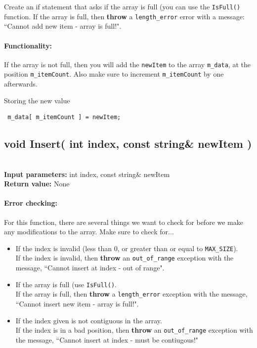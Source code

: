 \documentclass[a4paper,12pt]{book}
\begin{document}
    Create an if statement that asks if the array is full (you can use the
    \texttt{IsFull()} function. If the array is full, then
    \textbf{throw} a \texttt{length\_error}
    error with a message: ``Cannot add new item - array is full!".

    \paragraph{Functionality:} If the array is not full, then you will
    add the \texttt{newItem} to the array \texttt{m\_data}, at the
    position \texttt{m\_itemCount}. Also make sure to increment
    \texttt{m\_itemCount} by one afterwards.

    \begin{hint}{Storing the new value}
        \begin{verbatim} m_data[ m_itemCount ] = newItem; \end{verbatim}
    \end{hint}
    
    
    \hrulefill
    \subsection*{void Insert( int index, const string\& newItem )}

    \begin{framed} ~\\
        \textbf{Input parameters:} int index, const string\& newItem \\
        \textbf{Return value:} None
    \end{framed}

    \paragraph{Error checking:} For this function, there are several
    things we want to check for before we make any modifications to the array.
    Make sure to check for...

    \begin{itemize}
        \item If the index is invalid (less than 0, or greater than or equal to \texttt{MAX\_SIZE}). ~\\
        If the index is invalid, then \textbf{throw} an \texttt{out\_of\_range}
        exception with the message, ``Cannot insert at index - out of range".
        
        \item If the array is full (use \texttt{IsFull()}. ~\\
        If the array is full, then \textbf{throw} a \texttt{length\_error}
        exception with the message, ``Cannot insert new item - array is full!".
        
        \item If the index given is not contiguous in the array. ~\\
        If the index is in a bad position, then \textbf{throw} an \texttt{out\_of\_range}
        exception with the message, ``Cannot insert at index - must be contiugous!"
    \end{itemize}
    
\end{document}
